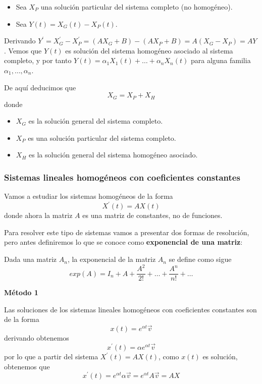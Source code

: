 \documentclass{mathnotes}
\begin{document}
\begin{itemize}
\item Sea $X_P$ una solución particular del sistema completo (no homogéneo). 

\item Sea $Y(t) = X_G(t)-X_P(t)$.
\end{itemize}
\noindent Derivando $Y^\prime = X_G^\prime -X_P^\prime = (AX_G+B)-(AX_P+B) = A(X_G-X_P) = AY$.
Vemos que $Y(t)$ es solución del sistema homogéneo asociado al sistema completo, y por tanto $Y(t) = \alpha_1X_1(t)+\hdots+\alpha_nX_n(t)$ para alguna familia $\alpha_1,\hdots,\alpha_n$.

De aquí deducimos que $$X_G = X_P+X_H$$
donde 
\begin{itemize}
\item $X_G$ es la solución general del sistema completo.

\item $X_P$ es una solución particular del sistema completo.

\item $X_H$ es la solución general del sistema homogéneo asociado.
\end{itemize}

\subsubsection{Sistemas lineales homogéneos con coeficientes constantes}
Vamos a estudiar los sistemas homogéneos de la forma $$X^\prime(t) = AX(t)$$
donde ahora la matriz $A$ es una matriz de constantes, no de funciones.

Para resolver este tipo de sistemas vamos a presentar dos formas de resolución, pero antes definiremos lo que se conoce como \textbf{exponencial de una matriz}:

\begin{definition}

Dada una matriz $A_n$, la exponencial de la matriz $A_n$ se define como sigue
$$exp(A) = I_n + A + \frac{A^2}{2!} + \hdots + \frac{A^n}{n!} + \hdots$$

\end{definition}

\vspace{5mm}
\noindent\textbf{Método 1}

Las soluciones de los sistemas lineales homogéneos con coeficientes constantes son de la forma $$x(t) = e^{\alpha t}\vec{v}$$
derivando obtenemos $$x^\prime(t) = \alpha e^{\alpha t}\vec{v}$$ por lo que a partir del sistema $X^\prime(t) = AX(t)$, como $x(t)$ es solución, obtenemos que $$x^\prime(t) = e^{\alpha t}\alpha\vec{v} = e^{\alpha t}A\vec{v} = AX$$
\end{document}
